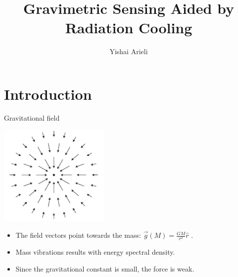 \documentclass{beamer}
\title[Gravimetric Sensing Aided by Radiation Cooling]{Gravimetric Sensing Aided by Radiation Cooling}
\author[Yishai Arieli]{Yishai Arieli}
\begin{document}
	\typesetFrontSlides

\section{Introduction}



\begin{frame}{\hypertarget{frame:Gravitational field}{Gravitational field}}
	\begin{center}		
		\includegraphics[width=0.4\textwidth,keepaspectratio]{gravity.png}
    \end{center}
	\begin{itemize}
		\item The field vectors point towards the mass: $\overrightarrow{g}(M) = \frac{GM}{r^2}\hat{r}$ .
		\item Mass vibrations results with energy spectral density.
		\item Since the gravitational constant is small, the force is weak.

		\end{itemize}
\end{frame}
\end{document}
